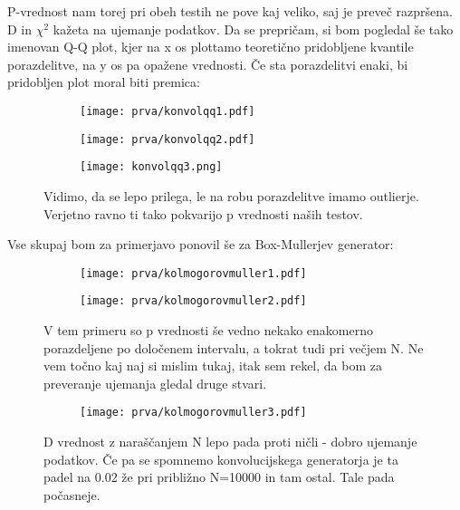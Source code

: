 \documentclass{article}
\begin{document}
P-vrednost nam torej pri obeh testih ne pove kaj veliko, saj je preveč razpršena. D in $\chi^2$ kažeta na ujemanje podatkov. Da se prepričam, si bom pogledal še tako imenovan Q-Q plot, kjer na x os plottamo teoretično pridobljene kvantile porazdelitve, na y os pa opažene vrednosti. Če sta porazdelitvi enaki, bi pridobljen plot moral biti premica:

\begin{figure}[H]
\centering
\begin{subfigure}{.32\textwidth}
\texttt{[image: prva/konvolqq1.pdf]}
\end{subfigure}
\begin{subfigure}{.32\textwidth}
\texttt{[image: prva/konvolqq2.pdf]}
\end{subfigure}
\begin{subfigure}{.32\textwidth}
\texttt{[image: konvolqq3.png]}
\end{subfigure}
\caption*{Vidimo, da se lepo prilega, le na robu porazdelitve imamo outlierje. Verjetno ravno ti tako pokvarijo p vrednosti naših testov.}
\end{figure}

Vse skupaj bom za primerjavo ponovil še za Box-Mullerjev generator:

\begin{figure}[H]
\centering
\begin{subfigure}{.49\textwidth}
\texttt{[image: prva/kolmogorovmuller1.pdf]}
\end{subfigure}
\begin{subfigure}{.49\textwidth}
\texttt{[image: prva/kolmogorovmuller2.pdf]}
\end{subfigure}
\caption*{V tem primeru so p vrednosti še vedno nekako enakomerno porazdeljene po določenem intervalu, a tokrat tudi pri večjem N. Ne vem točno kaj naj si mislim tukaj, itak sem rekel, da bom za preveranje ujemanja gledal druge stvari.}
\end{figure}

\begin{figure}[H]
\centering
\begin{subfigure}{.49\textwidth}
\texttt{[image: prva/kolmogorovmuller3.pdf]}
\end{subfigure}
\caption*{D vrednost z naraščanjem N lepo pada proti ničli - dobro ujemanje podatkov. Če pa se spomnemo konvolucijskega generatorja je ta padel na 0.02 že pri približno N=10000 in tam ostal. Tale pada počasneje.}
\end{figure}
\end{document}
